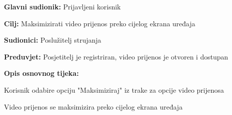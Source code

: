 					\noindent {}
					\begin{packed_item}
						
						\item \textbf{Glavni sudionik: } Prijavljeni korisnik
						\item  \textbf{Cilj:} Maksimizirati video prijenos preko cijelog ekrana uređaja
						\item  \textbf{Sudionici:} Poslužitelj strujanja
						\item  \textbf{Preduvjet:} Posjetitelj je registriran, video prijenos je otvoren i dostupan
						\item  \textbf{Opis osnovnog tijeka:}
						
						\item[] \begin{packed_enum}
							
							\item Korisnik odabire opciju "Maksimiziraj" iz trake za opcije video prijenosa 
							\item Video prijenos se maksimizira preko cijelog ekrana uređaja
							
						\end{packed_enum}
					
						

					\end{packed_item}
					
